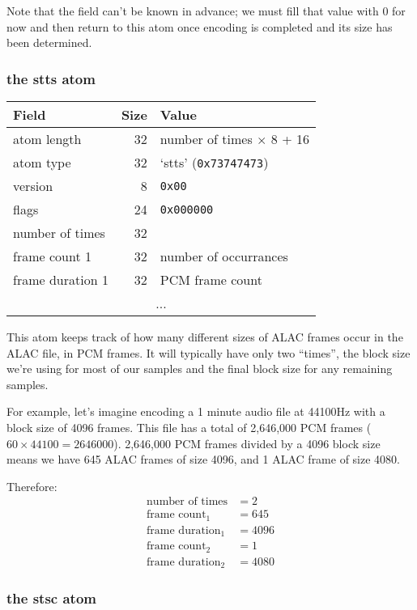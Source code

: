 Note that the  field can't be known in advance;
we must fill that value with 0 for now and then
return to this atom once encoding is completed
and its size has been determined.

\clearpage

\subsubsection{the stts atom}

\begin{table}[h]
\begin{tabular}{|l|r|l|}
\hline
Field & Size & Value \\
\hline
atom length & 32 & number of times $\times$ 8 + 16\\
atom type & 32 & `stts' (\texttt{0x73747473}) \\
\hline
version & 8 & \texttt{0x00} \\
flags & 24 & \texttt{0x000000} \\
number of times & 32 & \\
\hline
frame count 1 & 32 & number of occurrances \\
frame duration 1 & 32 & PCM frame count \\
\hline
\multicolumn{3}{|c|}{...} \\
\hline
\end{tabular}
\end{table}
This atom keeps track of how many different sizes of ALAC frames
occur in the ALAC file, in PCM frames.
It will typically have only two ``times'', the block size we're
using for most of our samples and the final block size for
any remaining samples.

For example, let's imagine encoding a 1 minute audio file
at 44100Hz with a block size of 4096 frames.
This file has a total of 2,646,000 PCM frames ($60 \times 44100 = 2646000$).
2,646,000 PCM frames divided by a 4096 block size means
we have 645 ALAC frames of size 4096, and 1 ALAC frame of size 4080.

Therefore:
\begin{align*}
\text{number of times} &= 2 \\
\text{frame count}_1 &= 645 \\
\text{frame duration}_1 &= 4096 \\
\text{frame count}_2 &= 1 \\
\text{frame duration}_2 &= 4080
\end{align*}

\subsubsection{the stsc atom}


